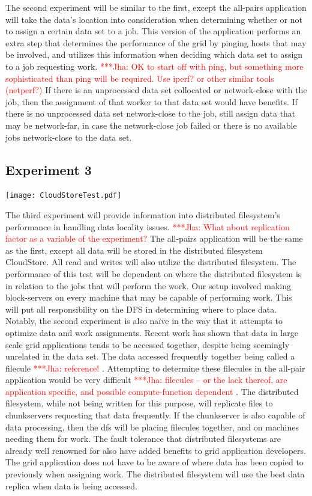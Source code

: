\documentclass[a4paper,11pt]{article} \usepackage[utf8]{inputenc}
\newcommand{\jhanote}[1]{ {\textcolor{red} { ***Jha: #1 }}}
\newcommand{\yyenote}[1]{ {\textcolor{blue} { ***yye00: #1 }}} \else
\newcommand{\jhanote}[1]{} \newcommand{\yyenote}[1]{}
\begin{document}
The second experiment will be similar to the first, except the all-pairs
application will take the data's location into consideration when
determining whether or not to assign a certain data set to a job. This
version of the application performs an extra step that determines the
performance of the grid by pinging hosts that may be involved, and
utilizes this information when deciding which data set to assign to a
job requesting work.  \jhanote{OK to start off with ping, but something
more sophisticated than ping will be required. Use iperf? or other
similar tools (netperf?)}  If there is an unprocessed data set
collocated or network-close with the job, then the assignment of that
worker to that data set would have benefits.  If there is no unprocessed
data set network-close to the job, still assign data that may be
network-far, in case the network-close job failed or there is no
available jobs network-close to the data set.

\subsection{Experiment 3}

\texttt{[image: CloudStoreTest.pdf]}

The third experiment will provide information into distributed
filesystem's performance in handling data locality issues.
\jhanote{What about replication factor as a variable of the experiment?}
The all-pairs application will be the same as the first, except all data
will be stored in the distributed filesystem CloudStore.  All read and
writes will also utilize the distributed filesystem.  The performance of
this test will be dependent on where the distributed filesystem is in
relation to the jobs that will perform the work.  Our setup involved
making block-servers on every machine that may be capable of performing
work.  This will put all responsibility on the DFS in determining where
to place data.  Notably, the second experiment is also naïve in the way
that it attempts to optimize data and work assignments.  Recent work has
shown that data in large scale grid applications tends to be accessed
together, despite being seemingly unrelated in the data set.  The data
accessed frequently together being called a filecule
\jhanote{reference!}.  Attempting to determine these filecules in the
all-pair application would be very difficult \jhanote{filecules -- or
the lack thereof, are application specific, and possible
compute-function dependent}. The distributed filesystem, while not being
written for this purpose, will replicate files to chunkservers
requesting that data frequently.  If the chunkserver is also capable of
data processing, then the dfs will be placing filecules together, and on
machines needing them for work.  The fault tolerance that distributed
filesystems are already well renowned for also have added benefits to
grid application developers.  The grid application does not have to be
aware of where data has been copied to previously when assigning work.
The distributed filesystem will use the best data replica when data is
being accessed.
\end{document}
